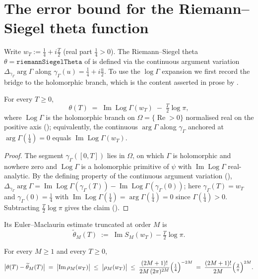 \section{The error bound for the Riemann--Siegel theta function}
\label{sec:hz_theta}

Write $w_T:=\tfrac14+i\tfrac T2$ (real part $\tfrac14>0$). The Riemann--Siegel theta
$\theta=\texttt{riemannSiegelTheta}$ of  is defined via the continuous
argument variation $\Delta_{\gamma_\Gamma}\arg\Gamma$ along $\gamma_\Gamma(u)=\tfrac14+i\tfrac u2$.
To use the $\log\Gamma$ expansion we first record the bridge to the holomorphic branch,
which is the content asserted in prose by .

\begin{lemma}
\label{lem:hz_theta_log}
\leanok
{}
For every $T\ge0$,
\[
  \theta(T)\;=\;\operatorname{Im}\operatorname{Log}\Gamma(w_T)\;-\;\tfrac T2\log\pi ,
\]
where $\operatorname{Log}\Gamma$ is the holomorphic branch on $\Omega=\{\operatorname{Re}>0\}$
normalised real on the positive axis (); equivalently, the continuous
$\arg\Gamma$ along $\gamma_\Gamma$ anchored at $\arg\Gamma(\tfrac14)=0$ equals
$\operatorname{Im}\operatorname{Log}\Gamma(w_T)$.
\end{lemma}

\begin{proof}
\leanok
{}
The segment $\gamma_\Gamma([0,T])$ lies in $\Omega$, on which $\Gamma$ is holomorphic and
nowhere zero and $\operatorname{Log}\Gamma$ is a holomorphic primitive of $\psi$ with
$\operatorname{Im}\operatorname{Log}\Gamma$ real-analytic. By the defining property of the
continuous argument variation (), $\Delta_{\gamma_\Gamma}\arg\Gamma
=\operatorname{Im}\operatorname{Log}\Gamma(\gamma_\Gamma(T))-\operatorname{Im}\operatorname{Log}\Gamma(\gamma_\Gamma(0))$;
here $\gamma_\Gamma(T)=w_T$ and $\gamma_\Gamma(0)=\tfrac14$ with
$\operatorname{Im}\operatorname{Log}\Gamma(\tfrac14)=\arg\Gamma(\tfrac14)=0$ since
$\Gamma(\tfrac14)>0$. Subtracting $\tfrac T2\log\pi$ gives the claim ().
\end{proof}

Its Euler--Maclaurin estimate truncated at order $M$ is
\[
  \widetilde\theta_M(T)\;:=\;\operatorname{Im}S_M(w_T)-\tfrac T2\log\pi .
\]

\begin{corollary}
\label{cor:hz_theta_unshifted}
\leanok
{}
For every $M\ge1$ and every $T\ge0$,
\[
  \bigl|\theta(T)-\widetilde\theta_M(T)\bigr|
  \;=\;\bigl|\operatorname{Im}\rho_M(w_T)\bigr|
  \;\le\;\bigl|\rho_M(w_T)\bigr|
  \;\le\;\frac{(2M+1)!}{2M\,(2\pi)^{2M}}\Bigl(\tfrac14\Bigr)^{-2M}
  \;=\;\frac{(2M+1)!}{2M}\Bigl(\tfrac2\pi\Bigr)^{2M}.
\]
\end{corollary}

